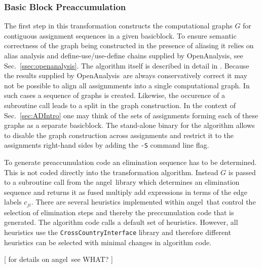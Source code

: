 \documentclass[11pt]{article}
\newcommand{\angel}{angel}
\newcommand{\basicblock}{basicblock}
\newcommand{\OpenAnalysis}{OpenAnalysis}
\newcommand{\code}[1]{{\small\tt{#1}}}
\newcommand{\refsec}[1]{{Sec.~\ref{#1}}}
\begin{document}
\subsubsection{Basic Block Preaccumulation}\label{sssec:BBPreacc}

The first step in this transformation constructs the computational graphs $G$ 
for contiguous 
assignment sequences in a given \basicblock. To ensure semantic 
correctness of the graph being constructed in the presence of 
aliasing it relies on alias analysis and define-use/use-define chains 
supplied by \OpenAnalysis, see \refsec{ssec:openanalysis}.
The algorithm itself is described in detail in \cite{Utk04FBB}.
Because the results supplied by \OpenAnalysis\ are always 
conservatively correct it may not be possible to align all 
assignmments into a single computational graph. In such cases 
a sequence of graphs is created. Likewise, the occurence 
of a subroutine call leads to a split in the graph construction. 
In the context of \refsec{sec:ADIntro} one may think of the sets of 
assignments forming each of these graphs as a separate \basicblock. 
The stand-alone binary for the algorithm allows to disable 
the graph construction across assignments and restrict it to 
the assignments right-hand sides by adding the \code{-S} command 
line flag. 

To generate preaccumulation code an elimination sequence has to be determined. 
This is not coded directly into the transformation algorithm. Instead 
$G$ is passed to a subroutine call from the \angel\ library \cite{angelWeb}
which determines an elimination sequence and returns it as 
fused multiply add expressions in terms of the edge labels $c_{ji}$.
There are several heuristics implemented within \angel\ that control 
the selection of elimination steps and thereby the preccumulation code 
that is generated.  The algorithm code calls a default set of heuristics. 
However, all heuristics use the \code{CrossCountryInterface} library and therefore 
different heuristics can be selected with minimal changes in algorithm code.   

{\color{red} [ for details on \angel\ see WHAT? ] } 
\end{document}
